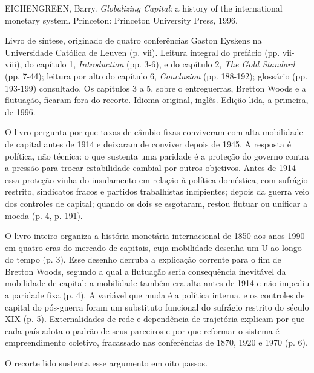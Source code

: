 
\begin{identificacao}
EICHENGREEN, Barry. \emph{Globalizing Capital}: a history of the international
monetary system. Princeton: Princeton University Press, 1996.

Livro de síntese, originado de quatro conferências Gaston Eyskens na
Universidade Católica de Leuven (p. vii). Leitura integral do prefácio
(pp. vii-viii), do capítulo 1, \emph{Introduction} (pp. 3-6), e do capítulo 2,
\emph{The Gold Standard} (pp. 7-44); leitura por alto do capítulo 6,
\emph{Conclusion} (pp. 188-192); glossário (pp. 193-199) consultado. Os
capítulos 3 a 5, sobre o entreguerras, Bretton Woods e a flutuação, ficaram
fora do recorte. Idioma original, inglês. Edição lida, a primeira, de 1996.
\end{identificacao}

O livro pergunta por que taxas de câmbio fixas conviveram com alta mobilidade
de capital antes de 1914 e deixaram de conviver depois de 1945. A resposta é
política, não técnica: o que sustenta uma paridade é a proteção do governo
contra a pressão para trocar estabilidade cambial por outros objetivos. Antes
de 1914 essa proteção vinha do insulamento em relação à política doméstica, com
sufrágio restrito, sindicatos fracos e partidos trabalhistas incipientes; depois
da guerra veio dos controles de capital; quando os dois se esgotaram, restou
flutuar ou unificar a moeda (p. 4, p. 191).

O livro inteiro organiza a história monetária internacional de 1850 aos anos
1990 em quatro eras do mercado de capitais, cuja mobilidade desenha um U ao
longo do tempo (p. 3). Esse desenho derruba a explicação corrente para o fim de
Bretton Woods, segundo a qual a flutuação seria consequência inevitável da
mobilidade de capital: a mobilidade também era alta antes de 1914 e não impediu
a paridade fixa (p. 4). A variável que muda é a política interna, e os controles
de capital do pós-guerra foram um substituto funcional do sufrágio restrito do
século XIX (p. 5). Externalidades de rede e dependência de trajetória explicam
por que cada país adota o padrão de seus parceiros e por que reformar o sistema
é empreendimento coletivo, fracassado nas conferências de 1870, 1920 e 1970
(p. 6).

O recorte lido sustenta esse argumento em oito passos.

